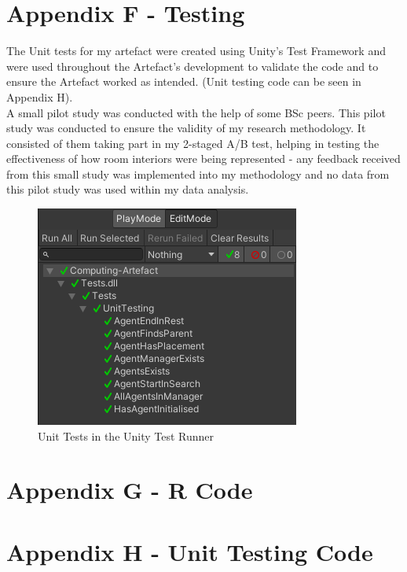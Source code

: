 \newpage
\section*{Appendix F - Testing} \label{append:f}
The Unit tests for my artefact were created using Unity's Test Framework and were used throughout the Artefact's development to validate the code and to ensure the Artefact worked as intended. (Unit testing code can be seen in Appendix H).
\\
A small pilot study was conducted with the help of some BSc peers. This pilot study was conducted to ensure the validity of my research methodology. It consisted of them taking part in my 2-staged A/B test, helping in testing the effectiveness of how room interiors were being represented - any feedback received from this small study was implemented into my methodology and no data from this pilot study was used within my data analysis.

\begin{figure}[ht]
    \includegraphics[width=\columnwidth]{./Images/unit-tests.png}
    \centering
    \caption{Unit Tests in the Unity Test Runner}
    \label{unit-tests}
\end{figure}

\newpage
\newpage
\section*{Appendix G - R Code} \label{append:g}




\newpage
\section*{Appendix H - Unit Testing Code} \label{append:h}
